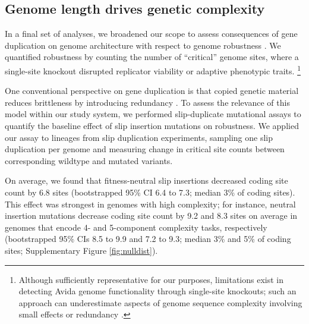 \subsection{Genome length drives genetic complexity}



In a final set of analyses, we broadened our scope to assess consequences of gene duplication on genome architecture with respect to genome robustness \citep{lenski1999genome}.
We quantified robustness by counting the number of ``critical'' genome sites, where a single-site knockout disrupted replicator viability or adaptive phenotypic traits.%
\footnote{%
Although sufficiently representative for our purposes, limitations exist in detecting Avida genome functionality through single-site knockouts; such an approach can underestimate aspects of genome sequence complexity involving small effects or redundancy \citep{lenski1999genome,moreno2024cryptic}.
}

One conventional perspective on gene duplication is that copied genetic material reduces brittleness by introducing redundancy \citep{wagner1996genetic}.
To assess the relevance of this model within our study system, we performed slip-duplicate mutational assays to quantify the baseline effect of slip insertion mutations on robustness.
We applied our assay to lineages from slip duplication experiments, sampling one slip duplication per genome and measuring change in critical site counts between corresponding wildtype and mutated variants.

On average, we found that fitness-neutral slip insertions decreased coding site count by 6.8 sites (bootstrapped 95\% CI 6.4 to 7.3; median 3\% of coding sites).
This effect was strongest in genomes with high complexity; for instance, neutral insertion mutations decrease coding site count by 9.2 and 8.3 sites on average in genomes that encode 4- and 5-component complexity tasks, respectively (bootstrapped 95\% CIs 8.5 to 9.9 and 7.2 to 9.3; median 3\% and 5\% of coding sites; Supplementary Figure \ref{fig:nulldist}).

